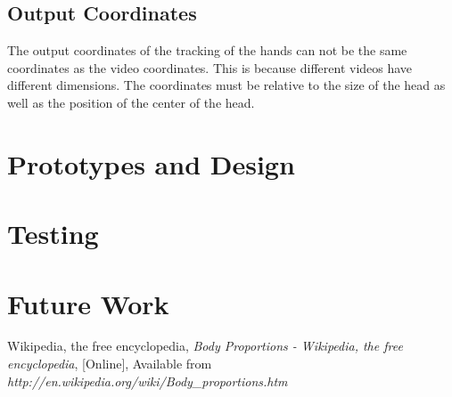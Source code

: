 \documentclass[a4paper,11pt,titlepage]{article}
\begin{document}
\subsection{Output Coordinates}
The output coordinates of the tracking of the hands can not be the same coordinates as the video coordinates. This is because different videos have different dimensions. The coordinates must be relative to the size of the head as well as the position of the center of the head.
\section{Prototypes and Design}
\section{Testing}
\section{Future Work}

\begin{thebibliography}{9}
 Wikipedia, the free encyclopedia,
\emph{Body Proportions - Wikipedia, the free encyclopedia},	
[Online], Available from \emph{http://en.wikipedia.org/wiki/Body\_proportions.htm}
\end{thebibliography}
\end{document}
